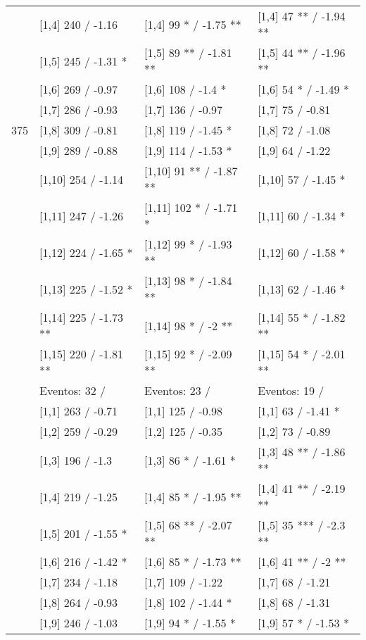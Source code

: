 \begin{table}
\begin{tabular}[t]{llll}
\addlinespace
 & {}[1,4] 240  / -1.16 & {}[1,4] 99 * / -1.75 ** & {}[1,4] 47 ** / -1.94 **\\
 & {}[1,5] 245  / -1.31 * & {}[1,5] 89 ** / -1.81 ** & {}[1,5] 44 ** / -1.96 **\\
 & {}[1,6] 269  / -0.97 & {}[1,6] 108  / -1.4 * & {}[1,6] 54 * / -1.49 *\\
 & {}[1,7] 286  / -0.93 & {}[1,7] 136  / -0.97 & {}[1,7] 75  / -0.81\\
375 & {}[1,8] 309  / -0.81 & {}[1,8] 119  / -1.45 * & {}[1,8] 72  / -1.08\\
\addlinespace
 & {}[1,9] 289  / -0.88 & {}[1,9] 114  / -1.53 * & {}[1,9] 64  / -1.22\\
 & {}[1,10] 254  / -1.14 & {}[1,10] 91 ** / -1.87 ** & {}[1,10] 57  / -1.45 *\\
 & {}[1,11] 247  / -1.26 & {}[1,11] 102 * / -1.71 * & {}[1,11] 60  / -1.34 *\\
 & {}[1,12] 224  / -1.65 * & {}[1,12] 99 * / -1.93 ** & {}[1,12] 60  / -1.58 *\\
 & {}[1,13] 225  / -1.52 * & {}[1,13] 98 * / -1.84 ** & {}[1,13] 62  / -1.46 *\\
\addlinespace
 & {}[1,14] 225  / -1.73 ** & {}[1,14] 98 * / -2 ** & {}[1,14] 55 * / -1.82 **\\
 & {}[1,15] 220  / -1.81 ** & {}[1,15] 92 * / -2.09 ** & {}[1,15] 54 * / -2.01 **\\
 & Eventos:  32 / & Eventos:  23 / & Eventos:  19 /\\
 & {}[1,1] 263  / -0.71 & {}[1,1] 125  / -0.98 & {}[1,1] 63  / -1.41 *\\
 & {}[1,2] 259  / -0.29 & {}[1,2] 125  / -0.35 & {}[1,2] 73  / -0.89\\
\addlinespace
 & {}[1,3] 196  / -1.3 & {}[1,3] 86 * / -1.61 * & {}[1,3] 48 ** / -1.86 **\\
 & {}[1,4] 219  / -1.25 & {}[1,4] 85 * / -1.95 ** & {}[1,4] 41 ** / -2.19 **\\
 & {}[1,5] 201  / -1.55 * & {}[1,5] 68 ** / -2.07 ** & {}[1,5] 35 *** / -2.3 **\\
 & {}[1,6] 216  / -1.42 * & {}[1,6] 85 * / -1.73 ** & {}[1,6] 41 ** / -2 **\\
 & {}[1,7] 234  / -1.18 & {}[1,7] 109  / -1.22 & {}[1,7] 68  / -1.21\\
\addlinespace
500 & {}[1,8] 264  / -0.93 & {}[1,8] 102  / -1.44 * & {}[1,8] 68  / -1.31\\
 & {}[1,9] 246  / -1.03 & {}[1,9] 94 * / -1.55 * & {}[1,9] 57 * / -1.53 *\\

\end{tabular}
\end{table}
